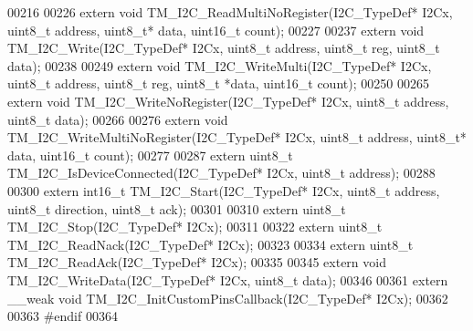 \begin{DoxyCode}
00216 
00226 \textcolor{keyword}{extern} \textcolor{keywordtype}{void} TM\_I2C\_ReadMultiNoRegister(I2C\_TypeDef* I2Cx, uint8\_t address, uint8\_t* data, uint16\_t count);
00227 
00237 \textcolor{keyword}{extern} \textcolor{keywordtype}{void} TM\_I2C\_Write(I2C\_TypeDef* I2Cx, uint8\_t address, uint8\_t reg, uint8\_t data);
00238 
00249 \textcolor{keyword}{extern} \textcolor{keywordtype}{void} TM\_I2C\_WriteMulti(I2C\_TypeDef* I2Cx, uint8\_t address, uint8\_t reg, uint8\_t *data, uint16\_t 
      count);
00250 
00265 \textcolor{keyword}{extern} \textcolor{keywordtype}{void} TM\_I2C\_WriteNoRegister(I2C\_TypeDef* I2Cx, uint8\_t address, uint8\_t data);
00266 
00276 \textcolor{keyword}{extern} \textcolor{keywordtype}{void} TM\_I2C\_WriteMultiNoRegister(I2C\_TypeDef* I2Cx, uint8\_t address, uint8\_t* data, uint16\_t count);
00277 
00287 \textcolor{keyword}{extern} uint8\_t TM\_I2C\_IsDeviceConnected(I2C\_TypeDef* I2Cx, uint8\_t address);
00288 
00300 \textcolor{keyword}{extern} int16\_t TM\_I2C\_Start(I2C\_TypeDef* I2Cx, uint8\_t address, uint8\_t direction, uint8\_t ack);
00301 
00310 \textcolor{keyword}{extern} uint8\_t TM\_I2C\_Stop(I2C\_TypeDef* I2Cx);
00311 
00322 \textcolor{keyword}{extern} uint8\_t TM\_I2C\_ReadNack(I2C\_TypeDef* I2Cx);
00323 
00334 \textcolor{keyword}{extern} uint8\_t TM\_I2C\_ReadAck(I2C\_TypeDef* I2Cx);
00335 
00345 \textcolor{keyword}{extern} \textcolor{keywordtype}{void} TM\_I2C\_WriteData(I2C\_TypeDef* I2Cx, uint8\_t data);
00346 
00361 \textcolor{keyword}{extern} \_\_weak \textcolor{keywordtype}{void} TM\_I2C\_InitCustomPinsCallback(I2C\_TypeDef* I2Cx);
00362 
00363 \textcolor{preprocessor}{#endif}
00364 
\end{DoxyCode}
